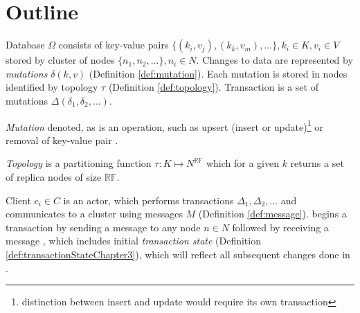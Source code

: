 

\section{Outline}
Database $\Omega$ consists of key-value pairs $\{(k_{i},v_{j}), (k_{k},v_{m}),...\}, k_i\in\mathit{K}, v_i\in\mathit{V}$ stored by cluster of nodes $\{n_1, n_2, ...\}, n_i\in\mathit{N}$.
Changes to data are represented by \emph{mutations} $\delta(k,v)$ (Definition \ref{def:mutation}). 
Each mutation is stored in nodes identified by topology $\tau$ (Definition \ref{def:topology}).
Transaction is a set of mutations $\Delta(\delta_{1}, \delta_{2}, ...)$.

\begin{definition}
  \label{def:mutation}
  \emph{Mutation} denoted, as  is an operation, such as upsert (insert or update)\footnote{distinction between insert and update would require its own transaction} or removal of key-value pair \kv. 
\end{definition}

\begin{definition}
\label{def:topology}
\emph{Topology} is a partitioning function $\tau:\mathit{K} \mapsto \mathit{N}^{\mathbb{RF}}$ which for a given $k$ returns a set of replica nodes of size $\mathbb{RF}$. 
\end{definition}


Client $c_{i}\in\mathit{C}$ is an actor, which performs transactions $\Delta_{1}, \Delta_{2}, ...$ and communicates to a cluster \nodes using messages $\mathit{M}$ (Definition \ref{def:message}). \client begins a transaction \transaction by sending a message \beginTransactionMessage to any node $n\in\mathit{N}$ followed by receiving a message 
\initialTxStateMessage, which includes 
initial \emph{transaction state} (Definition \ref{def:transactionStateChapter3}), which will reflect all subsequent changes done in \transaction.

